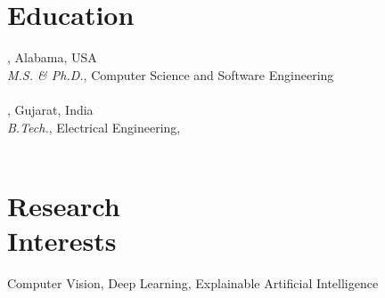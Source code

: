 \documentclass[mm]{simple_style}
\begin{document}
\begin{resume}

\iffalse
\vspace{-1ex}
\section{Biography}
\cusemph{Indian Institute of Technology Gandhinagar}, Gujarat, India\\
{\sl B.Tech.}, Electrical Engineering, \timeline{Jul' 12 - May' 16}
\\
\cusemph{GPA: 8.55/10}
\\[1ex]
\sectionline
\fi

\vspace{-1ex}
\section{Education}
, Alabama, USA\\
{\sl M.S. \& Ph.D.}, Computer Science and Software Engineering \\
{}
\\[2ex] 
, Gujarat, India\\
{\sl B.Tech.}, Electrical Engineering, 
\\
\\[1ex]
\sectionline

\vspace{-1ex}
\section{Research\\Interests}
\par
Computer Vision, Deep Learning, Explainable Artificial Intelligence


\end{resume}
\end{document}
